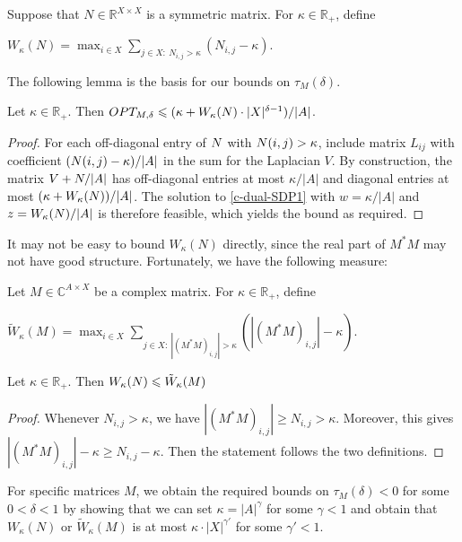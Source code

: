 \begin{defn}\label{d-W}
Suppose that $N\in \mathbb{R}^{X\times X}$ is a symmetric matrix.
For $\kappa\in \mathbb{R}_+$, define\\
\centerline{$\displaystyle W_\kappa(N)=\max_{i\in X} \sum_{j\in X:\ N_{i,j}> \kappa} (N_{i,j}-\kappa)$.}
\end{defn}


The following lemma is the basis for our bounds on $\tau_M(\delta)$.

\begin{lemma}
\label{c-SDP-lemma}
Let $\kappa\in \mathbb{R}_+$.  Then
$OPT_{M,\delta}\leqslant (\kappa+W_\kappa(N)\cdot |X|^{\delta-1})/|A|$.
\end{lemma}

\begin{sloppypar}
\begin{proof}
For each off-diagonal entry of $N$ with $N(i,j)>\kappa$,
include matrix $L_{ij}$ with coefficient $(N(i,j)-\kappa)/|A|$ in the sum for
the Laplacian $V$.
By construction, the matrix $V+N/|A|$ has off-diagonal entries
at most $\kappa/|A|$ and diagonal entries at most
$(\kappa+W_\kappa(N))/|A|$.  The solution to \eqref{c-dual-SDP1}
with $w=\kappa/|A|$ and $z=W_\kappa(N)/|A|$ is therefore feasible,
which yields the bound as required.
\end{proof}
\end{sloppypar}


It may not be easy to bound $W_\kappa(N)$ directly,
since the real part of $M^{*}M$ may not have good structure. 
Fortunately,
we have the following measure:
\begin{defn}
Let $M\in \mathbb{C}^{A\times X}$ be a complex matrix.
For $\kappa\in \mathbb{R}_+$, define\\
\centerline{$\displaystyle\tilde W_\kappa(M)=\max_{i\in X} \sum_{j\in X:\ |(M^{*}M)_{i,j}|> \kappa} (|(M^{*}M)_{i,j}|-\kappa)$.}
\end{defn}

\begin{proposition}
Let $\kappa\in \mathbb{R}_+$.  Then
$W_\kappa(N)\leqslant \tilde W_\kappa(M)$ 
\end{proposition}
\begin{proof}
Whenever $N_{i,j}> \kappa$,
we have $|(M^{*}M)_{i,j}|\geq N_{i,j}> \kappa$.
Moreover,
this gives $|(M^{*}M)_{i,j}|-\kappa\geq N_{i,j}-\kappa$.
Then the statement follows the two definitions.
\end{proof}


For specific matrices $M$, we obtain the required bounds on
$\tau_M(\delta)<0$ for some $0<\delta<1$ by showing that we can
set $\kappa=|A|^\gamma$ for some $\gamma<1$ and obtain that
$W_\kappa(N)$ or $\tilde W_\kappa(M)$ is at most
$\kappa\cdot |X|^{\gamma'}$ for some $\gamma'<1$.

